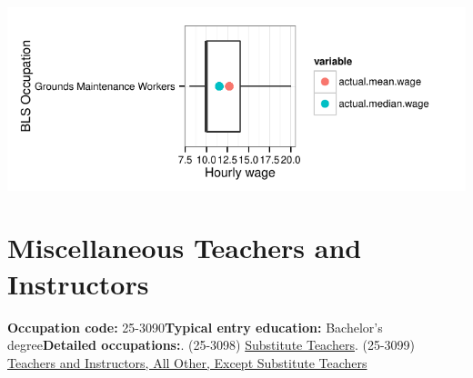 \documentclass[a4paper,10pt]{article}\usepackage[]{graphicx}\usepackage[]{color}
\makeatletter
\def\maxwidth{ %
  \ifdim\Gin@nat@width>\linewidth
    \linewidth
  \else
    \Gin@nat@width
  \fi
}
\makeatother
\begin{document}
{\centering \includegraphics[width=\maxwidth]{figure/unnamed-chunk-233} 

}


\newpage\section{Miscellaneous Teachers and Instructors}\textbf{Occupation code:} 25-3090\newline\textbf{Typical entry education:} Bachelor's degree\newline\textbf{Detailed occupations:}. (25-3098)  \href{http://www.bls.gov/oes/current/oes253098.htm}{Substitute Teachers}. (25-3099)  \href{http://www.bls.gov/oes/current/oes253099.htm}{Teachers and Instructors, All Other, Except Substitute Teachers}\newline%
\end{document}
